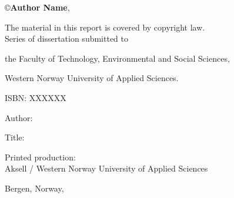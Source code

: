\documentclass[12pt]{book} %
\title{
    {\fontsize{20}{24}{\color{Maroon}\spaceduppercaps{Thesis Title Goes Here }}}
	\author{
        \textbf{Doctoral Dissertation by}\\ 
        \textbf{Author Name}\vspace{0.5cm}\\
		Thesis submitted for\\ 
        the degree of Philosophiae Doctor (PhD)\\
        in\\ 
        Computer Science:\\
        {\fontsize{12}{14}Software Engineering, Sensor Networks and Engineering Computing}\vspace{0.5cm}\\
		\texttt{[image: logos/logo.pdf]}\vspace{0.5cm}\\
        Department of Computer Science,\\ 
		Electrical Engineering and Mathematical Sciences\vspace{0.3cm}\\
		Faculty of Technology, Environmental and Social Sciences \vspace{0.3cm}\\
		Western Norway University of Applied Sciences
	}
	\date{Month day, year}
}
\begin{document}
\newcommand{\TextSize}{13}
\newcommand{\BaseLineSkip}{15}
\fontsize{\TextSize}{\BaseLineSkip}
\selectfont

\cleardoublepage
\maketitle
\thispagestyle{empty}

\normalsize\vspace*{12cm}
\begin{minipage}{13cm}

\copyright{\textbf{Author Name}}, \textbf{ \the\year{}}\vspace{2ex}  %

The material in this report is covered by copyright law.\vspace{3ex}\\

Series of dissertation submitted to

the Faculty of Technology, Environmental and Social Sciences,

Western Norway University of Applied Sciences.\vspace{3ex}

ISBN: XXXXXX\vspace{3ex} %


Author: 

Title: \vspace{4ex}

Printed production: \\
Aksell / Western Norway University of Applied Sciences \vspace{3ex}

Bergen, Norway, \the\year{}
\end{minipage}

\ifDraftMargin
\fi


\end{document}

